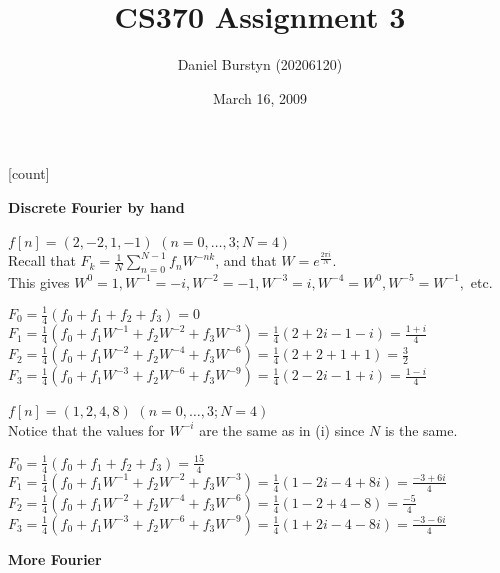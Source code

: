 \documentclass[12pt]{article}
\title{CS370 Assignment 3}
\author{Daniel Burstyn (20206120)}
\date{March 16, 2009}
\begin{document}
\maketitle
{}
[count]
\begin{list}{.}{}

\item \textbf{Discrete Fourier by hand}
\begin{list}{)}{}

\item $f[n]=(2,-2,1,-1)$  $(n=0,\dots,3; N=4)$\\
Recall that $F_k = \frac{1}{N} \sum_{n=0}^{N-1}f_nW^{-nk}$, and that $W =
e^{\frac{2 \pi i}{N}}$.\\
This gives $W^{0} = 1, W^{-1} = -i, W^{-2} = -1, W^{-3} = i, W^{-4} = W^{0},
W^{-5} = W^{-1}, $ etc.

$F_0 = \frac{1}{4}(f_0 + f_1 + f_2 + f_3) = 0$\\
$F_1 = \frac{1}{4}(f_0 + f_1W^{-1} + f_2W^{-2} + f_3W^{-3})
     = \frac{1}{4}(2 +2i -1 -i) = \frac{1 + i}{4}$\\
$F_2 = \frac{1}{4}(f_0 + f_1W^{-2} + f_2W^{-4} + f_3W^{-6})
     = \frac{1}{4}(2 +2 +1 +1) = \frac{3}{2}$\\
$F_3 = \frac{1}{4}(f_0 + f_1W^{-3} + f_2W^{-6} + f_3W^{-9})
     = \frac{1}{4}(2 -2i -1 +i) = \frac{1 - i}{4}$\\

\item $f[n]=(1,2,4,8)$  $(n=0,\dots,3; N=4)$\\
Notice that the values for $W^{-i}$ are the same as in (i) since $N$ is the
same.

$F_0 = \frac{1}{4}(f_0 + f_1 + f_2 + f_3) = \frac{15}{4}$\\
$F_1 = \frac{1}{4}(f_0 + f_1W^{-1} + f_2W^{-2} + f_3W^{-3})
     = \frac{1}{4}(1 -2i -4 +8i) = \frac{-3 + 6i}{4}$\\
$F_2 = \frac{1}{4}(f_0 + f_1W^{-2} + f_2W^{-4} + f_3W^{-6})
     = \frac{1}{4}(1 -2 +4 -8) = \frac{-5}{4}$\\
$F_3 = \frac{1}{4}(f_0 + f_1W^{-3} + f_2W^{-6} + f_3W^{-9})
     = \frac{1}{4}(1 +2i -4 -8i) = \frac{-3 - 6i}{4}$\\

\end{list}

\item \textbf{More Fourier}
\begin{list}{)}{}


\end{list}
\end{list}
\end{document}
